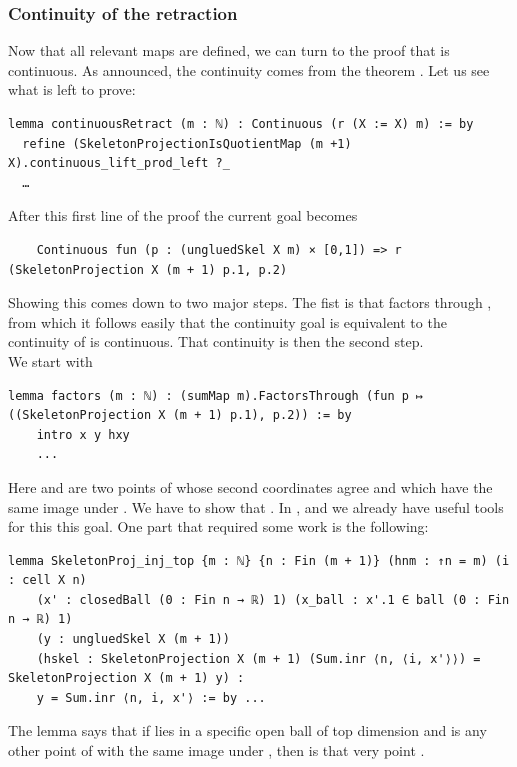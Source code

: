 \documentclass[11pt, a4paper, english]{article}
\theoremstyle{plain}
\theoremstyle{definition}
\theoremstyle{remark}
\numberwithin{equation}{section}
\numberwithin{theorem}{section}
\begin{document}
\subsubsection{Continuity of the retraction} \label{subsubsec:lean:skel:continuityretraction}
Now that all relevant maps are defined, we can turn to the proof that  is continuous. As announced, the continuity comes from the theorem . Let us see what is left to prove: 

\begin{verbatim}
lemma continuousRetract (m : ℕ) : Continuous (r (X := X) m) := by
  refine (SkeletonProjectionIsQuotientMap (m +1) X).continuous_lift_prod_left ?_
  …  
\end{verbatim}
After this first line of the proof the current goal becomes
\begin{verbatim}
    Continuous fun (p : (ungluedSkel X m) × [0,1]) => r (SkeletonProjection X (m + 1) p.1, p.2) 
\end{verbatim} 
Showing this comes down to two major steps. The fist is that  factors through , from which it follows easily that the continuity goal is equivalent to the continuity of  is continuous. That continuity is then the second step.\\
We start with 
\begin{verbatim}
lemma factors (m : ℕ) : (sumMap m).FactorsThrough (fun p ↦ ((SkeletonProjection X (m + 1) p.1), p.2)) := by 
    intro x y hxy 
    ...
\end{verbatim}
Here  and  are two points of  whose second coordinates agree and which have the same image under . We have to show that . In , and  we already have useful tools for this this goal. One part that required some work is the following: 
\begin{verbatim}
lemma SkeletonProj_inj_top {m : ℕ} {n : Fin (m + 1)} (hnm : ↑n = m) (i : cell X n)
    (x' : closedBall (0 : Fin n → ℝ) 1) (x_ball : x'.1 ∈ ball (0 : Fin n → ℝ) 1)
    (y : ungluedSkel X (m + 1))
    (hskel : SkeletonProjection X (m + 1) (Sum.inr ⟨n, ⟨i, x'⟩⟩) = SkeletonProjection X (m + 1) y) :
    y = Sum.inr ⟨n, i, x'⟩ := by ...
\end{verbatim}
The lemma  says that if  lies in a specific open ball of top dimension and  is any other point of  with the same image under , then  is that very point . \\
\end{document}
